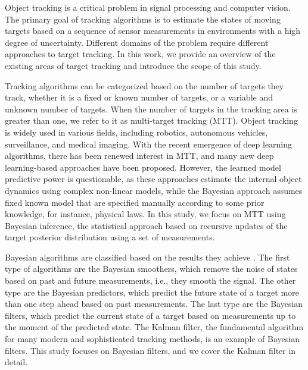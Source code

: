 Object tracking is a critical problem in signal processing and computer vision. The primary goal of tracking algorithms is to estimate the states of moving targets based on a sequence of sensor measurements in environments with a high degree of uncertainty. Different domains of the problem require different approaches to target tracking. In this work, we provide an overview of the existing areas of target tracking and introduce the scope of this study.

Tracking algorithms can be categorized based on the number of targets they track, whether it is a fixed or known number of targets, or a variable and unknown number of targets. When the number of targets in the tracking area is greater than one, we refer to it as multi-target tracking (MTT). Object tracking is widely used in various fields, including robotics, autonomous vehicles, surveillance, and medical imaging. With the recent emergence of deep learning algorithms, there has been renewed interest in MTT, and many new deep learning-based approaches have been proposed. However, the learned model predictive power is questionable, as these approaches estimate the internal object dynamics using complex non-linear models, while the Bayesian approach assumes fixed known model that are specified manually according to some prior knowledge, for instance, physical laws. In this study, we focus on MTT using Bayesian inference, the statistical approach based on recursive updates of the target posterior distribution using a set of measurements.

Bayesian algorithms are classified based on the results they achieve \cite[11]{sarkkaBayesianFilteringSmoothing2013}. The first type of algorithms are the Bayesian smoothers, which remove the noise of states based on past and future measurements, i.e., they smooth the signal. The other type are the Bayesian predictors, which predict the future state of a target more than one step ahead based on past measurements. The last type are the Bayesian filters, which predict the current state of a target based on measurements up to the moment of the predicted state. The Kalman filter, the fundamental algorithm for many modern and sophisticated tracking methods, is an example of Bayesian filters. This study focuses on Bayesian filters, and we cover the Kalman filter in detail.

